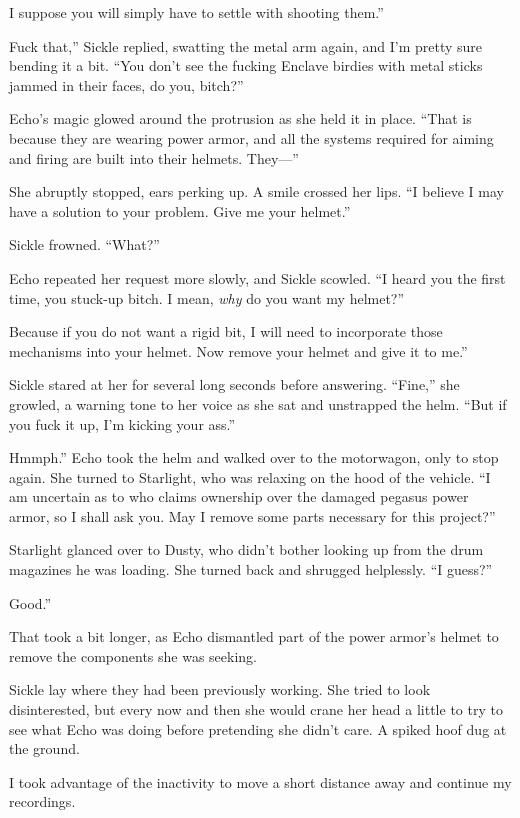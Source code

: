 \leavevmode{}I suppose you will simply have to settle with shooting them.”

\leavevmode{}Fuck that,” Sickle replied, swatting the metal arm again, and I’m pretty sure bending it a bit. “You don’t see the fucking Enclave birdies with metal sticks jammed in their faces, do you, bitch?”

Echo’s magic glowed around the protrusion as she held it in place. “That is because they are wearing power armor, and all the systems required for aiming and firing are built into their helmets. They—”

She abruptly stopped, ears perking up. A smile crossed her lips. “I believe I may have a solution to your problem. Give me your helmet.”

Sickle frowned. “What?”

Echo repeated her request more slowly, and Sickle scowled. “I heard you the first time, you stuck-up bitch. I mean, \textit{why} do you want my helmet?”

\leavevmode{}Because if you do not want a rigid bit, I will need to incorporate those mechanisms into your helmet. Now remove your helmet and give it to me.”

Sickle stared at her for several long seconds before answering. “Fine,” she growled, a warning tone to her voice as she sat and unstrapped the helm. “But if you fuck it up, I’m kicking your ass.”

\leavevmode{}Hmmph.” Echo took the helm and walked over to the motorwagon, only to stop again. She turned to Starlight, who was relaxing on the hood of the vehicle. “I am uncertain as to who claims ownership over the damaged pegasus power armor, so I shall ask you. May I remove some parts necessary for this project?”

Starlight glanced over to Dusty, who didn’t bother looking up from the drum magazines he was loading. She turned back and shrugged helplessly. “I guess?”

\leavevmode{}Good.”

That took a bit longer, as Echo dismantled part of the power armor’s helmet to remove the components she was seeking.

Sickle lay where they had been previously working. She tried to look disinterested, but every now and then she would crane her head a little to try to see what Echo was doing before pretending she didn’t care. A spiked hoof dug at the ground.

I took advantage of the inactivity to move a short distance away and continue my recordings.

